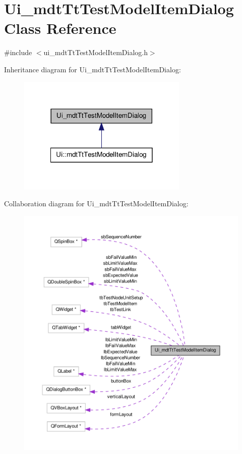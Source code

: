 \hypertarget{class_ui__mdt_tt_test_model_item_dialog}{\section{Ui\-\_\-mdt\-Tt\-Test\-Model\-Item\-Dialog Class Reference}
\label{class_ui__mdt_tt_test_model_item_dialog}
}


{\ttfamily \#include $<$ui\-\_\-mdt\-Tt\-Test\-Model\-Item\-Dialog.\-h$>$}



Inheritance diagram for Ui\-\_\-mdt\-Tt\-Test\-Model\-Item\-Dialog\-:
\nopagebreak
\begin{figure}[H]
\begin{center}
\leavevmode
\includegraphics[width=230pt]{class_ui__mdt_tt_test_model_item_dialog__inherit__graph}
\end{center}
\end{figure}


Collaboration diagram for Ui\-\_\-mdt\-Tt\-Test\-Model\-Item\-Dialog\-:
\nopagebreak
\begin{figure}[H]
\begin{center}
\leavevmode
\includegraphics[width=350pt]{class_ui__mdt_tt_test_model_item_dialog__coll__graph}
\end{center}
\end{figure}
